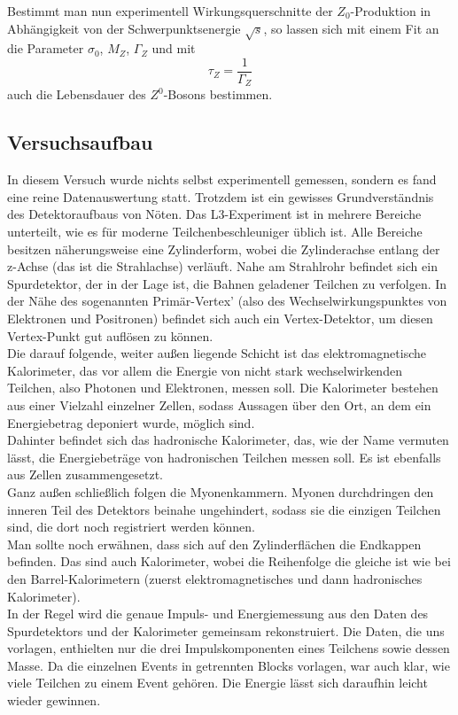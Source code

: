Bestimmt man nun experimentell Wirkungsquerschnitte der $Z_0$-Produktion in
Abhängigkeit von der Schwerpunktsenergie $\sqrt{s}$, so lassen sich mit einem
Fit an  die Parameter $\sigma_0$, $M_Z$, $\Gamma_Z$ und mit
\begin{equation}
  \tau_Z = \frac{1}{\Gamma_Z}
\end{equation}
auch die Lebensdauer des $Z^0$-Bosons bestimmen.





\subsection{Versuchsaufbau}
In diesem Versuch wurde nichts selbst experimentell gemessen, sondern es fand
eine reine Datenauswertung statt. Trotzdem ist ein gewisses Grundverständnis des
Detektoraufbaus von Nöten. Das L3-Experiment ist in mehrere Bereiche unterteilt,
wie es für moderne Teilchenbeschleuniger üblich ist. Alle Bereiche besitzen näherungsweise eine Zylinderform, wobei die Zylinderachse entlang der z-Achse (das ist die Strahlachse) verläuft. Nahe am Strahlrohr befindet sich ein Spurdetektor, der in der Lage ist, die Bahnen geladener Teilchen zu verfolgen. In der Nähe des sogenannten Primär-Vertex' (also des Wechselwirkungspunktes von Elektronen und Positronen) befindet sich auch ein Vertex-Detektor, um diesen Vertex-Punkt gut auflösen zu können.\\
Die darauf folgende, weiter außen liegende Schicht ist das elektromagnetische Kalorimeter, das vor allem die Energie von nicht stark wechselwirkenden Teilchen, also Photonen und Elektronen, messen soll. Die Kalorimeter bestehen aus einer Vielzahl einzelner Zellen, sodass Aussagen über den Ort, an dem ein Energiebetrag deponiert wurde, möglich sind.\\
Dahinter befindet sich das hadronische Kalorimeter, das, wie der Name vermuten lässt, die Energiebeträge von hadronischen Teilchen messen soll. Es ist ebenfalls aus Zellen zusammengesetzt.\\
Ganz außen schließlich folgen die Myonenkammern. Myonen durchdringen den inneren Teil des Detektors beinahe ungehindert, sodass sie die einzigen Teilchen sind, die dort noch registriert werden können.\\
Man sollte noch erwähnen, dass sich auf den Zylinderflächen die Endkappen befinden. Das sind auch Kalorimeter, wobei die Reihenfolge die gleiche ist wie bei den Barrel-Kalorimetern (zuerst elektromagnetisches und dann hadronisches Kalorimeter).\\
In der Regel wird die genaue Impuls- und Energiemessung aus den Daten des Spurdetektors und der Kalorimeter gemeinsam rekonstruiert. Die Daten, die uns vorlagen, enthielten nur die drei Impulskomponenten eines Teilchens sowie dessen Masse. Da die einzelnen Events in getrennten Blocks vorlagen, war auch klar, wie viele Teilchen zu einem Event gehören. Die Energie lässt sich daraufhin leicht wieder gewinnen.